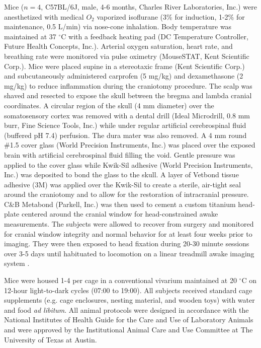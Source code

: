 \documentclass[12pt]{spieman}
\begin{document}
\begin{spacing}{2}
Mice ($n = 4$, C57BL/6J, male, 4-6 months, Charles River Laboratories, Inc.) were anesthetized with medical $O_2$ vaporized isoflurane (3\% for induction, 1-2\% for maintenance, 0.5 L/min) via nose-cone inhalation. Body temperature was maintained at 37 $^\circ$C with a feedback heating pad (DC Temperature Controller, Future Health Concepts, Inc.). Arterial oxygen saturation, heart rate, and breathing rate were monitored via pulse oximetry (MouseSTAT, Kent Scientific Corp.). Mice were placed supine in a stereotaxic frame (Kent Scientific Corp.) and subcutaneously administered carprofen (5 mg/kg) and dexamethasone (2 mg/kg) to reduce inflammation during the craniotomy procedure. The scalp was shaved and resected to expose the skull between the bregma and lambda cranial coordinates. A circular region of the skull (4 mm diameter) over the somatosensory cortex was removed with a dental drill (Ideal Microdrill, 0.8 mm burr, Fine Science Tools, Inc.) while under regular artificial cerebrospinal fluid (buffered pH 7.4) perfusion. The dura mater was also removed. A 4 mm round \#1.5 cover glass (World Precision Instruments, Inc.) was placed over the exposed brain with artificial cerebrospinal fluid filling the void. Gentle pressure was applied to the cover glass while Kwik-Sil adhesive (World Precision Instruments, Inc.) was deposited to bond the glass to the skull. A layer of Vetbond tissue adhesive (3M) was applied over the Kwik-Sil to create a sterile, air-tight seal around the craniotomy and to allow for the restoration of intracranial pressure. C\&B Metabond (Parkell, Inc.) was then used to cement a custom titanium head-plate centered around the cranial window for head-constrained awake measurements. The subjects were allowed to recover from surgery and monitored for cranial window integrity and normal behavior for at least four weeks prior to imaging. They were then exposed to head fixation during 20-30 minute sessions over 3-5 days until habituated to locomotion on a linear treadmill awake imaging system \cite{He:2020}.

Mice were housed 1-4 per cage in a conventional vivarium maintained at 20 $^\circ$C on 12-hour light-to-dark cycles (07:00 to 19:00). All subjects received standard cage supplements (e.g. cage enclosures, nesting material, and wooden toys) with water and food \textit{ad libitum}. All animal protocols were designed in accordance with the National Institutes of Health Guide for the Care and Use of Laboratory Animals and were approved by the Institutional Animal Care and Use Committee at The University of Texas at Austin.


\end{spacing}
\end{document}
